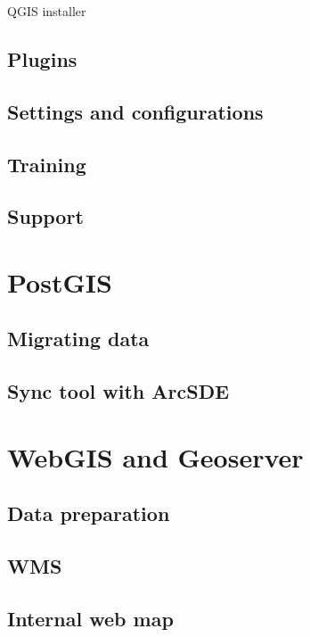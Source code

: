 \begin{frame}{QGIS installer}
	
	
\end{frame}

\subsection{Plugins}


\subsection{Settings and configurations}


\subsection{Training}


\subsection{Support}

\section{PostGIS}

\subsection{Migrating data}
\subsection{Sync tool with ArcSDE}

\section{WebGIS and Geoserver}
\subsection{Data preparation}
\subsection{WMS}
\subsection{Internal web map}

